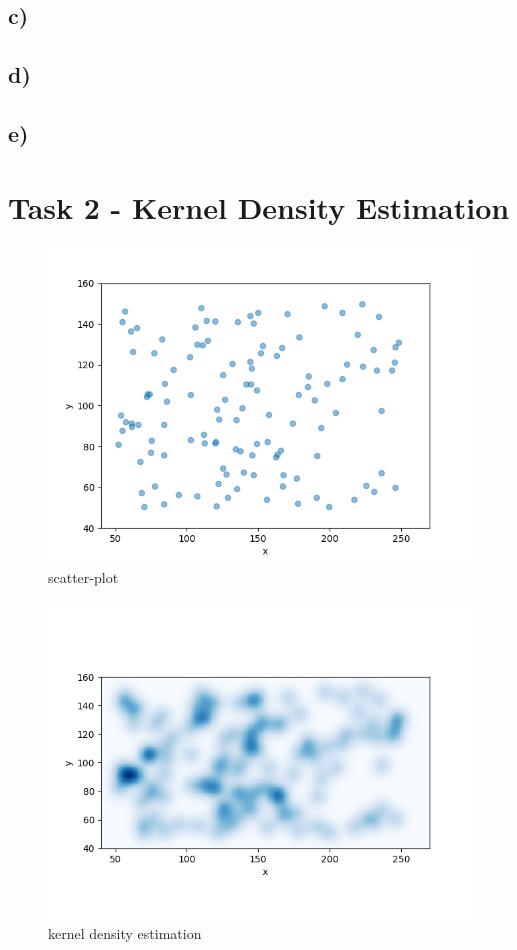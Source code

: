 \documentclass[a4paper]{article}
\begin{document}
\subsection*{c)}
\subsection*{d)}
\subsection*{e)}

\section*{Task 2 - Kernel Density Estimation}
\begin{figure}[th!]
	\centering
	\includegraphics[width=0.7\linewidth]{scatter}
	\caption{scatter-plot}
	\label{fig:scatter}
\end{figure}

\begin{figure}[th!]
	\centering
	\includegraphics[width=0.7\linewidth]{density}
	\caption{kernel density estimation}
	\label{fig:density}
\end{figure}
\end{document}
